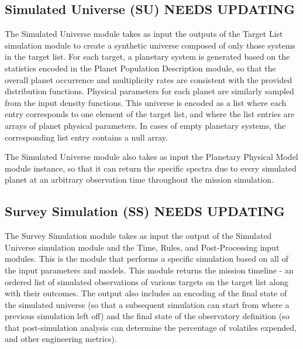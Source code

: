 \documentclass[]{asme2ej}
\begin{document}

\subsection{Simulated Universe (SU) NEEDS UPDATING}
The Simulated Universe module takes as input the outputs of the Target List simulation module to create a synthetic universe composed of only those systems in the target list.  For each target, a planetary system is generated based on the statistics encoded in the Planet Population Description module, so that the overall planet occurrence and multiplicity rates are consistent with the provided distribution functions.  Physical parameters for each planet are similarly sampled from the input density functions.  This universe is encoded as a list where each entry corresponds to one element of the target list, and where the list entries are arrays of planet physical parameters.  In cases of empty planetary systems, the corresponding list entry contains a null array.

The Simulated Universe module also takes as input the Planetary Physical Model module instance, so that it can return the specific spectra due to every simulated planet at an arbitrary observation time throughout the mission simulation.


\subsection{Survey Simulation (SS) NEEDS UPDATING}
The Survey Simulation module takes as input the output of the Simulated Universe simulation module and the Time, Rules, and Post-Processing input modules. This is the module that performs a specific simulation based on all of the input parameters and models. This module returns the mission timeline - an ordered list of simulated observations of various targets on the target list along with their outcomes.  The output also includes an encoding of the final state of the simulated universe (so that a subsequent simulation can start from where a previous simulation left off) and the final state of the observatory definition (so that post-simulation analysis can determine the percentage of volatiles expended, and other engineering metrics).

\end{document}

